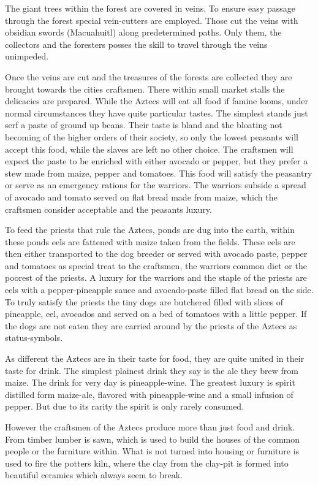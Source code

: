 \documentclass[a4paper]{book}
\begin{document}
	The giant trees within the forest are covered in veins.
	To ensure easy passage through the forest special vein-cutters are employed.
	Those cut the veins with obsidian swords (Macuahuitl) along predetermined paths.
	Only them, the collectors and the foresters posses the skill to travel through the veins unimpeded.

	Once the veins are cut and the treasures of the forests are collected they are
	brought towards the cities craftsmen.
	There within small market stalls the delicacies are prepared.
	While the \gls{Aztecs} will eat all food if famine looms,
	under normal circumstances they have quite particular tastes.
	The simplest stands just serf a paste of ground up beans.
	Their taste is bland and the bloating not becoming of the higher orders of their society,
	so only the lowest peasants will accept this food,
	while the slaves are left no other choice.
	The craftsmen will expect the paste to be enriched with either avocado or pepper,
	but they prefer a stew made from maize, pepper and tomatoes.
	This food will satisfy the peasantry or serve as an emergency rations for the warriors.
	The warriors subside a spread of avocado and tomato served on flat bread made from maize,
	which the craftsmen consider acceptable and the peasants luxury.

	To feed the priests that rule the \gls{Aztecs},
	ponds are dug into the earth,
	within these ponds eels are fattened with maize taken from the fields.
	These eels are then either transported to the dog breeder or
	served with avocado paste, pepper and tomatoes as special treat to the craftsmen,
	the warriors common diet or the poorest of the priests.
	A luxury for the warriors and the staple of the priests are eels with a pepper-pineapple sauce
	and avocado-paste filled flat bread on the side.
	To truly satisfy the priests the tiny dogs are butchered filled with slices of pineapple,
	eel, avocados and served on a bed of tomatoes with a little pepper.
	If the dogs are not eaten they are carried around by the priests of the \gls{Aztecs}
	as status-symbols.

	As different the \gls{Aztecs} are in their taste for food,
	they are quite united in their taste for drink.
	The simplest plainest drink they say is the ale they brew from maize.
	The drink for very day is pineapple-wine.
	The greatest luxury is spirit distilled form maize-ale, flavored with pineapple-wine
	and a small infusion of pepper.
	But due to its rarity the spirit is only rarely consumed.

	However the craftsmen of the \gls{Aztecs} produce more than just food and drink.
	From timber lumber is sawn, which is used to build the houses of the common people
	or the furniture within.
	What is not turned into housing or furniture is used to fire the potters kiln,
	where the clay from the clay-pit is formed into beautiful ceramics which always seem to break.
\end{document}
